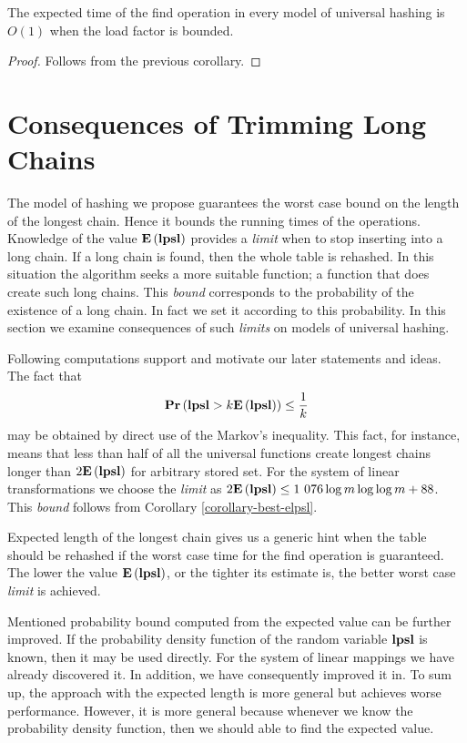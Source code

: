 \begin{corollary}
\label{corollary-find-time}
The expected time of the find operation in every model of universal hashing is $O(1)$ when the load factor is bounded.
\end{corollary}
\begin{proof}
Follows from the previous corollary.
\end{proof}

\section{Consequences of Trimming Long Chains}
The model of hashing we propose guarantees the worst case bound on the length of the longest chain. Hence it bounds the running times of the operations. Knowledge of the value $\mathbf{E}\left(\mathbf{lpsl}\right)$ provides a \emph{limit} when to stop inserting into a long chain. If a long chain is found, then the whole table is rehashed. In this situation the algorithm seeks a more suitable function; a function that does create such long chains. This \emph{bound} corresponds to the probability of the existence of a long chain. In fact we set it according to this probability. In this section we examine consequences of such \emph{limits} on models of universal hashing.

Following computations support and motivate our later statements and ideas. The fact that \[ \mathbf{Pr}\left(\mathbf{lpsl} > k \mathbf{E}\left(\mathbf{lpsl}\right)\right) \leq \frac{1}{k} \] may be obtained by direct use of the Markov's inequality. This fact, for instance, means that less than half of all the universal functions create longest chains longer than $2 \mathbf{E}\left(\mathbf{lpsl}\right)$ for arbitrary stored set. For the system of linear transformations we choose the \emph{limit} as $2\mathbf{E}\left(\mathbf{lpsl}\right) \leq \text{1 076} \log m \log \log m + 88$. This \emph{bound} follows from Corollary \ref{corollary-best-elpsl}.

Expected length of the longest chain gives us a generic hint when the table should be rehashed if the worst case time for the find operation is guaranteed. The lower the value $\mathbf{E}\left(\mathbf{lpsl}\right)$, or the tighter its estimate is, the better worst case \emph{limit} is achieved.

Mentioned probability bound computed from the expected value can be further improved. If the probability density function of the random variable $\mathbf{lpsl}$ is known, then it may be used directly. For the system of linear mappings we have already discovered it. In addition, we have consequently improved it in. To sum up, the approach with the expected length is more general but achieves worse performance. However, it is more general because whenever we know the probability density function, then we should able to find the expected value.

